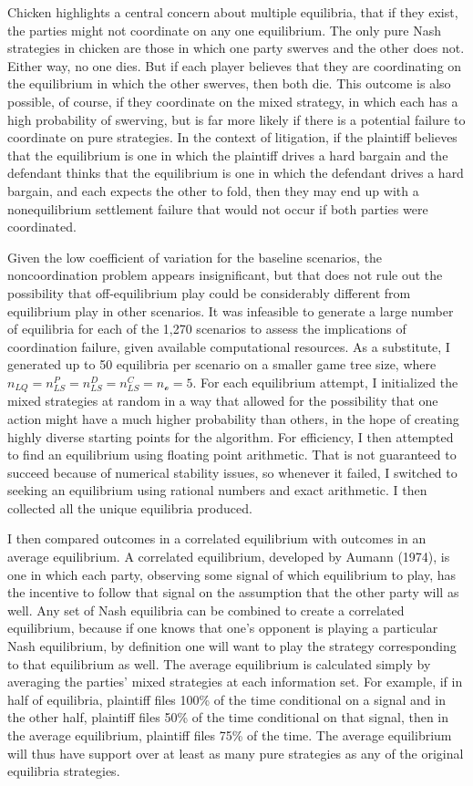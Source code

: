 \documentclass{article}
\begin{document}
Chicken highlights a central concern about multiple equilibria, that if they exist, the parties might not coordinate on any one equilibrium. The only pure Nash strategies in chicken are those in which one party swerves and the other does not. Either way, no one dies. But if each player believes that they are coordinating on the equilibrium in which the other swerves, then both die. This outcome is also possible, of course, if they coordinate on the mixed strategy, in which each has a high probability of swerving, but is far more likely if there is a potential failure to coordinate on pure strategies. In the context of litigation, if the plaintiff believes that the equilibrium is one in which the plaintiff drives a hard bargain and the defendant thinks that the equilibrium is one in which the defendant drives a hard bargain, and each expects the other to fold, then they may end up with a nonequilibrium settlement failure that would not occur if both parties were coordinated.

Given the low coefficient of variation for the baseline scenarios, the noncoordination problem appears insignificant, but that does not rule out the possibility that off-equilibrium play could be considerably different from equilibrium play in other scenarios.  It was infeasible to generate a large number of equilibria for each of the 1,270 scenarios to assess the implications of coordination failure, given available computational resources. As a substitute, I generated up to 50 equilibria per scenario on a smaller game tree size, where $n_{LQ}=n_{LS}^P=n_{LS}^D=n_{LS}^C=n_{\mathcal{o}}=5$. For each equilibrium attempt, I initialized the mixed strategies at random in a way that allowed for the possibility that one action might have a much higher probability than others, in the hope of creating highly diverse starting points for the algorithm. For efficiency, I then attempted to find an equilibrium using floating point arithmetic. That is not guaranteed to succeed because of numerical stability issues, so whenever it failed, I switched to seeking an equilibrium using rational numbers and exact arithmetic. I then collected all the unique equilibria produced. 

I then compared outcomes in a correlated equilibrium with outcomes in an average equilibrium. A correlated equilibrium, developed by Aumann (1974), is one in which each party, observing some signal of which equilibrium to play, has the incentive to follow that signal on the assumption that the other party will as well. Any set of Nash equilibria can be combined to create a correlated equilibrium, because if one knows that one's opponent is playing a particular Nash equilibrium, by definition one will want to play the strategy corresponding to that equilibrium as well. The average equilibrium is calculated simply by averaging the parties' mixed strategies at each information set. For example, if in half of equilibria, plaintiff files 100\% of the time conditional on a signal and in the other half, plaintiff files 50\% of the time conditional on that signal, then in the average equilibrium, plaintiff files 75\% of the time. The average equilibrium will thus have support over at least as many pure strategies as any of the original equilibria strategies. 
\end{document}
